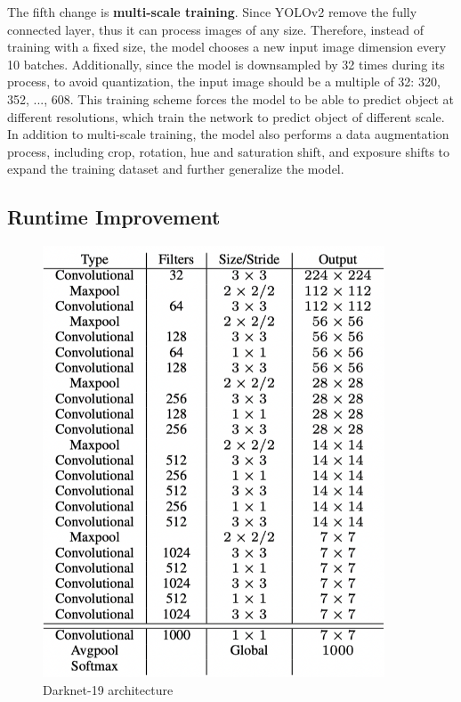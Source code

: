 The fifth change is \textbf{multi-scale training}. Since YOLOv2 remove the fully connected layer, thus it can process images of any size. Therefore, instead of training with a fixed size, the model chooses a new input image dimension every 10 batches. Additionally, since the model is downsampled by 32 times during its process, to avoid quantization, the input image should be a multiple of 32: {320, 352, ..., 608}. This training scheme forces the model to be able to predict object at different resolutions, which train the network to predict object of different scale. In addition to multi-scale training, the model also performs a data augmentation process, including crop, rotation, hue and saturation shift, and exposure shifts to expand the training dataset and further generalize the model.

\subsection{Runtime Improvement}
\begin{figure}[!ht]
    \centering
    \includegraphics[width=4in]{figures/darknet19_archite.png}
    \caption{Darknet-19 architecture \cite{yolo9000_2017}} 
    \label{fig:darknet19_archite}
\end{figure}
